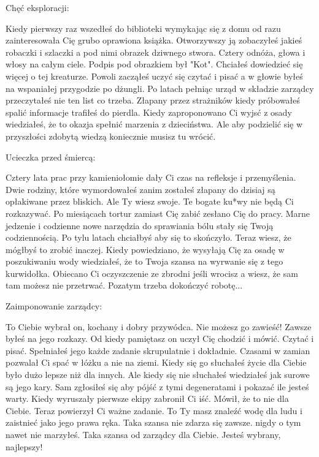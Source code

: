 \documentclass{article}
\begin{document}
    \bigskip

    Chęć eksploracji:
    \begin{tcolorbox}
        \ttfamily
        Kiedy pierwszy raz wszedłeś do biblioteki wymykając się z domu od razu zainteresowała Cię grubo oprawiona książka. Otworzywszy ją zobaczyłeś jakieś robaczki i szlaczki a pod nimi obrazek dziwnego stwora. Cztery odnóża, głowa i włosy na całym ciele. Podpis pod obrazkiem był "Kot". Chciałeś dowiedzieć się więcej o tej kreaturze. Powoli zacząłeś uczyć się czytać i pisać a w głowie byłeś na wspaniałej przygodzie po dżungli. Po latach pełniąc urząd w składzie zarządcy przeczytałeś nie ten list co trzeba. Złapany przez strażników kiedy próbowałeś spalić informacje trafiłeś do pierdla. Kiedy zaproponowano Ci wyjsć z osady wiedziałeś, że to okazja spełnić marzenia z dzieciństwa. Ale aby podzielić się w przyszłości zdobytą wiedzą koniecznie musisz tu wrócić.
    \end{tcolorbox}


    \bigskip

    Ucieczka przed śmiercą:

    \begin{tcolorbox}
        \ttfamily
        Cztery lata prac przy kamieniołomie dały Ci czas na refleksje i przemyślenia. Dwie rodziny, które wymordowałeś zanim zostałeś złapany do dzisiaj są opłakiwane przez bliskich. Ale Ty wiesz swoje. Te bogate ku*wy nie będą Ci rozkazywać. Po miesiącach tortur zamiast Cię zabić zesłano Cię do pracy. Marne jedzenie i codzienne nowe narzędzia do sprawiania bólu stały się Twoją codziennością. Po tylu latach chciałbyś aby się to skończyło. Teraz wiesz, że mógłbyś to zrobić inaczej. Kiedy powiedziano, że wysyłają Cię za osadę w poszukiwaniu wody wiedziałeś, że to Twoja szansa na wyrwanie się z tego kurwidołka. Obiecano Ci oczyszczenie ze zbrodni jeśli wrocisz a wiesz, że sam tam możesz nie przetrwać. Pozatym trzeba dokończyć robotę...
    \end{tcolorbox}

    \newpage
    \bigskip

    Zaimponowanie zarządcy:

    \begin{tcolorbox}
        \ttfamily
        To Ciebie wybrał on, kochany i dobry przywódca. Nie możesz go zawieść! Zawsze byłeś na jego rozkazy. Od kiedy pamiętasz on uczył Cię chodzić i mówić. Czytać i pisać. Spełniałeś jego każde zadanie skrupulatnie i dokładnie. Czasami w zamian pozwalał Ci spać w łóżku a nie na ziemi. Kiedy się go słuchałeś życie dla Ciebie było dużo lepsze niż dla innych. Ale kiedy się nie słuchałeś wiedziałeś jak surowe są jego kary. Sam zgłosiłeś się aby pójść z tymi degeneratami i pokazać ile jesteś warty. Kiedy wyruszały pierwsze ekipy zabronił Ci iść. Mówił, że to nie dla Ciebie. Teraz powierzył Ci ważne zadanie. To Ty masz znaleźć wodę dla ludu i zaistnieć jako jego prawa ręka. Taka szansa nie zdarza się zawsze. nigdy o tym nawet nie marzyłeś. Taka szansa od zarządcy dla Ciebie. Jesteś wybrany, najlepszy!
    \end{tcolorbox}
\end{document}

